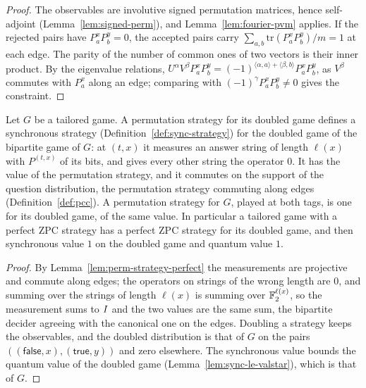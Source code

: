\begin{proof}
\leanok
The observables are involutive signed permutation matrices, hence self-adjoint
(Lemma~\ref{lem:signed-perm}), and Lemma~\ref{lem:fourier-pvm} applies. If the rejected pairs
have $P^x_a P^y_b = 0$, the accepted pairs carry $\sum_{a, b} \mathrm{tr}(P^x_a P^y_b)/m = 1$ at
each edge. The parity of the number of common ones of two vectors is their inner product. By the
eigenvalue relations, $U^\alpha V^\beta P^x_a P^y_b = (-1)^{\langle \alpha, a\rangle + \langle
\beta, b\rangle} P^x_a P^y_b$, as $V^\beta$ commutes with $P^x_a$ along an edge; comparing with
$(-1)^\gamma P^x_a P^y_b \neq 0$ gives the constraint.
\end{proof}

\begin{lemma}
\label{lem:zpc-pcc}
\leanok
Let $G$ be a tailored game. A permutation strategy for its doubled game defines a synchronous
strategy (Definition~\ref{def:sync-strategy}) for the doubled game of the bipartite game of $G$:
at $(t, x)$ it measures an answer string of length $\ell(x)$ with $P^{(t, x)}$ of its bits, and
gives every other string the operator $0$. It has the value of the permutation strategy, and it
commutes on the support of the question distribution, the permutation strategy commuting along
edges (Definition~\ref{def:pcc}). A permutation strategy for $G$, played at both tags, is one for
its doubled game, of the same value. In particular a tailored game with a perfect ZPC strategy
has a perfect ZPC strategy for its doubled game, and then synchronous value $1$ on the doubled
game and quantum value $1$.
\end{lemma}

\begin{proof}
\leanok
By Lemma~\ref{lem:perm-strategy-perfect} the measurements are projective and commute along
edges; the operators on strings of the wrong length are $0$, and summing over the strings of
length $\ell(x)$ is summing over $\mathbb{F}_2^{\ell(x)}$, so the measurement sums to $I$ and the two
values are the same sum, the bipartite decider agreeing with the canonical one on the edges.
Doubling a strategy keeps the observables, and the doubled distribution is that of $G$ on the
pairs $((\mathsf{false}, x), (\mathsf{true}, y))$ and zero elsewhere. The synchronous value
bounds the quantum value of the doubled game (Lemma~\ref{lem:sync-le-valstar}), which is that of
$G$.
\end{proof}

